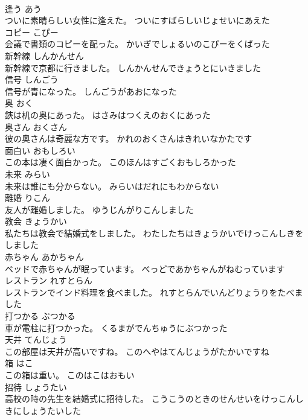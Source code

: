 \documentclass[8pt]{extreport}
\begin{document}
\begin{CJK}{UTF8}{min}
\\	逢う	あう	
\\	ついに素晴らしい女性に逢えた。	ついにすばらしいじょせいにあえた	
\\	コピー	こぴー	
\\	会議で書類のコピーを配った。	かいぎでしょるいのこぴーをくばった	
\\	新幹線	しんかんせん	
\\	新幹線で京都に行きました。	しんかんせんできょうとにいきました	
\\	信号	しんごう	
\\	信号が青になった。	しんごうがあおになった	
\\	奥	おく	
\\	鋏は机の奥にあった。	はさみはつくえのおくにあった	
\\	奥さん	おくさん	
\\	彼の奥さんは奇麗な方です。	かれのおくさんはきれいなかたです	
\\	面白い	おもしろい	
\\	この本は凄く面白かった。	このほんはすごくおもしろかった	
\\	未来	みらい	
\\	未来は誰にも分からない。	みらいはだれにもわからない	
\\	離婚	りこん	
\\	友人が離婚しました。	ゆうじんがりこんしました	
\\	教会	きょうかい	
\\	私たちは教会で結婚式をしました。	わたしたちはきょうかいでけっこんしきをしました	
\\	赤ちゃん	あかちゃん	
\\	ベッドで赤ちゃんが眠っています。	べっどであかちゃんがねむっています	
\\	レストラン	れすとらん	
\\	レストランでインド料理を食べました。	れすとらんでいんどりょうりをたべました	
\\	打つかる	ぶつかる	
\\	車が電柱に打つかった。	くるまがでんちゅうにぶつかった	
\\	天井	てんじょう	
\\	この部屋は天井が高いですね。	このへやはてんじょうがたかいですね	
\\	箱	はこ	
\\	この箱は重い。	このはこはおもい	
\\	招待	しょうたい	
\\	高校の時の先生を結婚式に招待した。	こうこうのときのせんせいをけっこんしきにしょうたいした	

\end{CJK}
\end{document}

